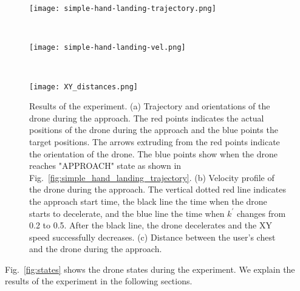 \begin{figure}
        \begin{minipage}[t]{\columnwidth}
          \centering
          \texttt{[image: simple-hand-landing-trajectory.png]}
          \subcaption{}
          \label{fig:simple_hand_landing_trajectory}
        \end{minipage} \\
        \begin{minipage}[t]{\columnwidth}
          \centering
          \texttt{[image: simple-hand-landing-vel.png]}
          \subcaption{}
          \label{fig:simple_hand_landing_vel}
        \end{minipage} \\
        \begin{minipage}[t]{\columnwidth}
          \centering
          \texttt{[image: XY\_distances.png]}
          \subcaption{}
          \label{fig:simple_hand_landing_xy_distances}
        \end{minipage}
    \caption{Results of the experiment. 
    (a) Trajectory and orientations of the drone during the approach.
    The red points indicates the actual positions of the drone during the approach and the blue points the target positions. 
    The arrows extruding from the red points indicate the orientation of the drone.
    The blue points show when the drone reaches "APPROACH" state as shown in Fig.~\ref{fig:simple_hand_landing_trajectory}.
    (b) Velocity profile of the drone during the approach. 
    The vertical dotted red line indicates the approach start time,
    the black line the time when the drone starts to decelerate,
    and the blue line the time when $k^\prime$ changes from 0.2 to 0.5.
    After the black line, the drone decelerates and the XY speed successfully decreases.
    (c) Distance between the user's chest and the drone during the approach.
}
\end{figure}

Fig.~\ref{fig:states} shows the drone states during the experiment.
We explain the results of the experiment in the following sections.

